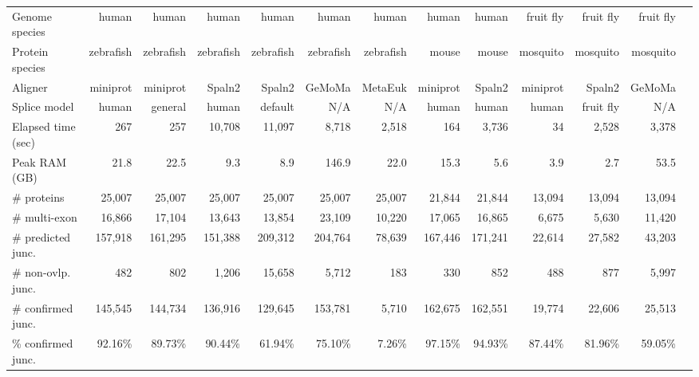 \documentclass{bioinfo}
\begin{document}
\begin{table*}[!tb]
{\label{tab:eval}
\begin{tabular*}{\textwidth}{@{\extracolsep{\fill}}lrrrrrrrrrrrr}
\toprule
Genome species     & human   & human   & human   & human   & human   & human   & human   & human   &fruit fly&fruit fly&fruit fly \\
Protein species    &zebrafish&zebrafish&zebrafish&zebrafish&zebrafish&zebrafish& mouse   & mouse   & mosquito& mosquito& mosquito \\
Aligner            & miniprot& miniprot& Spaln2  & Spaln2  &  GeMoMa & MetaEuk & miniprot& Spaln2  & miniprot& Spaln2  &   GeMoMa \\
Splice model       & human   & general & human   & default &     N/A &     N/A & human   & human   & human   &fruit fly&      N/A \\
\midrule
Elapsed time (sec) &     267 &     257 &  10,708 &  11,097 &   8,718 &   2,518 &     164 &   3,736 &      34 &   2,528 &    3,378 \\
Peak RAM (GB)      &    21.8 &    22.5 &     9.3 &     8.9 &   146.9 &    22.0 &    15.3 &     5.6 &     3.9 &     2.7 &     53.5 \\
\# proteins        &  25,007 &  25,007 &  25,007 &  25,007 &  25,007 &  25,007 &  21,844 &  21,844 &  13,094 &  13,094 &   13,094 \\
\# multi-exon      &  16,866 &  17,104 &  13,643 &  13,854 &  23,109 &  10,220 &  17,065 &  16,865 &   6,675 &   5,630 &   11,420 \\
\# predicted junc. & 157,918 & 161,295 & 151,388 & 209,312 & 204,764 &  78,639 & 167,446 & 171,241 &  22,614 &  27,582 &   43,203 \\
\# non-ovlp. junc. &     482 &     802 &   1,206 &  15,658 &   5,712 &     183 &     330 &     852 &     488 &     877 &    5,997 \\
\# confirmed junc. & 145,545 & 144,734 & 136,916 & 129,645 & 153,781 &   5,710 & 162,675 & 162,551 &  19,774 &  22,606 &   25,513 \\
\% confirmed junc. & 92.16\% & 89.73\% & 90.44\% & 61.94\% & 75.10\% &  7.26\% & 97.15\% & 94.93\% & 87.44\% & 81.96\% &  59.05\% \\

\end{tabular*}}
\end{table*}
\end{document}
